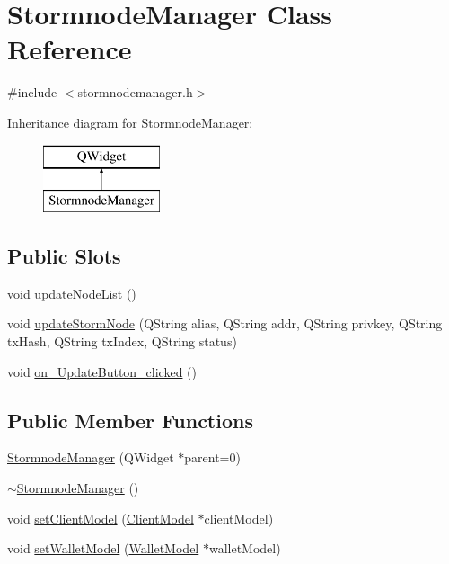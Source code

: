 \hypertarget{class_stormnode_manager}{}\section{Stormnode\+Manager Class Reference}
\label{class_stormnode_manager}


{\ttfamily \#include $<$stormnodemanager.\+h$>$}

Inheritance diagram for Stormnode\+Manager\+:\begin{figure}[H]
\begin{center}
\leavevmode
\includegraphics[height=2.000000cm]{class_stormnode_manager}
\end{center}
\end{figure}
\subsection*{Public Slots}
\begin{DoxyCompactItemize}
\item 
void \hyperlink{class_stormnode_manager_a5cba8d5a6fda3cb986372678f766170f}{update\+Node\+List} ()
\item 
void \hyperlink{class_stormnode_manager_a44edd7083dc8e92e1083b492e781513b}{update\+Storm\+Node} (Q\+String alias, Q\+String addr, Q\+String privkey, Q\+String tx\+Hash, Q\+String tx\+Index, Q\+String status)
\item 
void \hyperlink{class_stormnode_manager_a8176df10b7594a5d37aeb8d41941a52b}{on\+\_\+\+Update\+Button\+\_\+clicked} ()
\end{DoxyCompactItemize}
\subsection*{Public Member Functions}
\begin{DoxyCompactItemize}
\item 
\hyperlink{class_stormnode_manager_abbf5b0f2ae3578d576182fe7a3a92488}{Stormnode\+Manager} (Q\+Widget $\ast$parent=0)
\item 
\hyperlink{class_stormnode_manager_ab11545626564a6297afa91ef575a6fd9}{$\sim$\+Stormnode\+Manager} ()
\item 
void \hyperlink{class_stormnode_manager_ab44da43c24ef293ea3c548883d270f99}{set\+Client\+Model} (\hyperlink{class_client_model}{Client\+Model} $\ast$client\+Model)
\item 
void \hyperlink{class_stormnode_manager_a624b7c64eed1e9691733bd9473e98344}{set\+Wallet\+Model} (\hyperlink{class_wallet_model}{Wallet\+Model} $\ast$wallet\+Model)
\end{DoxyCompactItemize}


